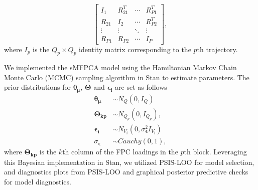\documentclass[aoas,preprint]{imsart}
\begin{document}
\begin{equation*}
\begin{bmatrix}
I_1 & R_{21}^T & \cdots & R_{P1}^T \\
R_{21} & I_2 & \cdots  & R_{P2}^T \\
\vdots & \vdots & \ddots & \vdots \\
R_{P1} & R_{P2} & \cdots & I_P
\end{bmatrix},
\end{equation*}
where $I_p$ is the $Q_p \times Q_p$ identity matrix corresponding to the $p$th trajectory. 

We implemented the sMFPCA model using the Hamiltonian Markov Chain Monte Carlo (MCMC) sampling algorithm in \textsf{Stan} to estimate parameters. The prior distributions for $\boldsymbol{\theta_\mu}$, $\boldsymbol{\Theta}$ and $\boldsymbol{\epsilon_i}$ are set as follows
\begin{equation}
\begin{aligned}
\boldsymbol{\theta_\mu} &\sim N_Q(0, I_Q) \\
\boldsymbol{\Theta_{kp}} &\sim N_{Q_p}(0, I_{Q_p}), \\
\boldsymbol{\epsilon_i} &\sim N_{V_i}(0,  \sigma_{\boldsymbol\epsilon}^2 I_{V_i}) \\
\sigma_{\boldsymbol\epsilon} &\sim Cauchy(0,1), \nonumber 
\end{aligned}
\end{equation}
where $\boldsymbol{\Theta_{kp}}$ is the $k$th column of the FPC loadings in the $p$th block. Leveraging this Bayesian implementation in \textsf{Stan}, we utilized PSIS-LOO for model selection, and diagnostics plots from PSIS-LOO and graphical posterior predictive checks for model diagnostics. 
\end{document}

